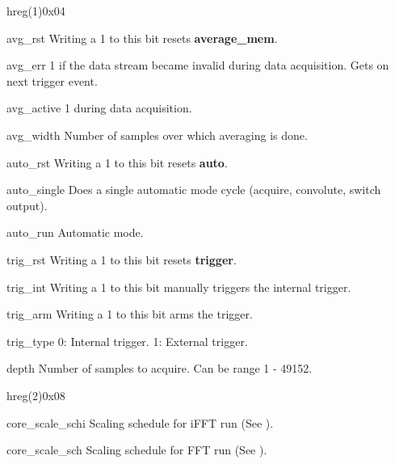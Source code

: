 \documentclass[12pt,a4paper,parskip=full,abstract=true,BCOR=12mm,twoside,open=right]{scrreprt}
\def\module#1{{\ttfamily\bfseries #1}}
\begin{document}
\begin{register}{h}{reg(1)}{0x04}%
    \label{reg1}%
    \regnewline%
    \begin{regdesc}\begin{reglist}
        \item[avg\_rst] Writing a 1 to this bit resets \module{average\_mem}.
        \item[avg\_err] 1 if the data stream became invalid during data
            acquisition. Gets on next trigger event.
        \item[avg\_active] 1 during data acquisition.
        \item[avg\_width] Number of samples over which averaging is done.
        \item[auto\_rst] Writing a 1 to this bit resets \module{auto}.
        \item[auto\_single] Does a single automatic mode cycle
            (acquire, convolute, switch output).
        \item[auto\_run] Automatic mode.
        \item[trig\_rst] Writing a 1 to this bit resets \module{trigger}.
        \item[trig\_int] Writing a 1 to this bit manually triggers the
            internal trigger.
        \item[trig\_arm] Writing a 1 to this bit arms the trigger.
        \item[trig\_type] 0: Internal trigger. 1: External trigger.
        \item[depth] Number of samples to acquire. Can be range 1 - 49152.
    \end{reglist}\end{regdesc}
\end{register}
\begin{register}{h}{reg(2)}{0x08}%
    \label{reg2}%
    \regnewline%
    \begin{regdesc}\begin{reglist}
        \item[core\_scale\_schi] Scaling schedule for iFFT run (See
            \cite{xilinx_fft}).
        \item[core\_scale\_sch] Scaling schedule for FFT run (See
            \cite{xilinx_fft}).
    \end{reglist}\end{regdesc}
\end{register}
\end{document}
